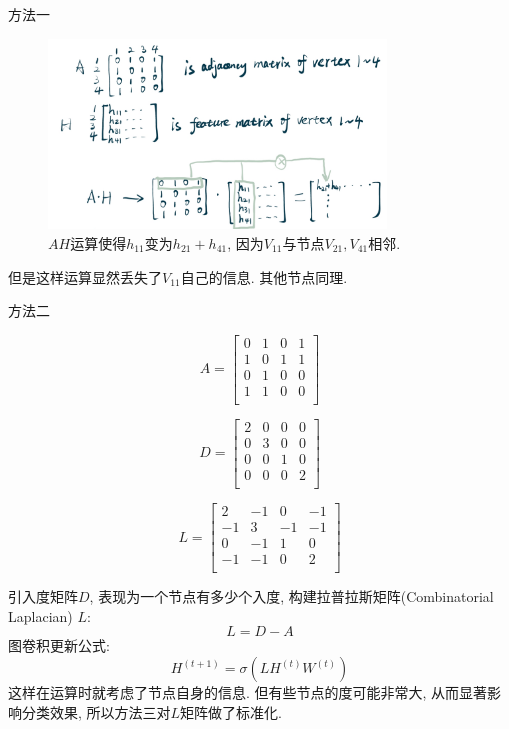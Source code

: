 \documentclass{beamer}
\begin{document}
\begin{frame}{方法一}
    \vspace{-0.5cm}
    \begin{figure}
        \centering
        \includegraphics[width=0.8\textwidth]{聚合1.png}
        \caption{$AH$运算使得$h_{11}$变为$h_{21}+h_{41}$, 因为$V_{11}$与节点$V_{21}, V_{41}$相邻.}
    \end{figure}
    但是这样运算显然丢失了$V_{11}$自己的信息. 其他节点同理.
\end{frame}

\begin{frame}{方法二}\footnotesize
    \vspace{-1cm}
    \begin{multicols}{3}
        \[
            A =
            \begin{bmatrix}
                0 & 1 & 0 & 1 \\
                1 & 0 & 1 & 1 \\
                0 & 1 & 0 & 0 \\
                1 & 1 & 0 & 0 \\
            \end{bmatrix}
        \]

        \[
            D =
            \begin{bmatrix}
                2 & 0 & 0 & 0 \\
                0 & 3 & 0 & 0 \\
                0 & 0 & 1 & 0 \\
                0 & 0 & 0 & 2 \\
            \end{bmatrix}
        \]

        \[
            L =
            \begin{bmatrix}
                2  & -1 & 0  & -1 \\
                -1 & 3  & -1 & -1 \\
                0  & -1 & 1  & 0  \\
                -1 & -1 & 0  & 2  \\
            \end{bmatrix}
        \]
    \end{multicols}
    引入度矩阵$D$, 表现为一个节点有多少个入度, 构建拉普拉斯矩阵(Combinatorial Laplacian) $L$:
    $$L = D - A$$
    图卷积更新公式:
    $$ H^{(t+1)} = \sigma(LH^{(t)}W^{(t)}) $$
    这样在运算时就考虑了节点自身的信息. 但有些节点的度可能非常大, 从而显著影响分类效果, 所以方法三对$L$矩阵做了标准化.
\end{frame}
\end{document}
